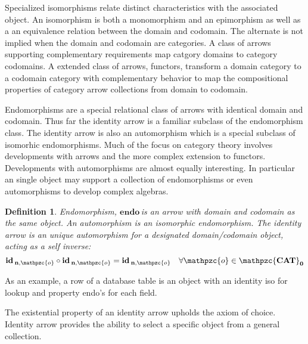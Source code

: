 \documentclass[aps,twocolumn,secnumarabic,nobalancelastpage,amsmath,amssymb,
amsthm,nofootinbib,parskip=full]{revtex4}
\numberwithin{equation}{section}
\newtheorem{definition}{Definition}[section]
\newcommand{\subp}[1]{\mathbf{#1}}
\newcommand{\obk}[1]{\mathpzc{#1}}
\newcommand{\oarrid}[2]{\oper{id}_{\subp{#1},\obk{#2}}}
\newcommand{\wrpobj}[1]{#1_{\subp{0}}}
\newcommand{\oper}[1]{\mathbf{#1}\,}
\newcommand{\largecat}{\mathbf{\mathpzc{CAT}}}
\newcommand{\largecatobj}{\wrpobj{\largecat}}
\begin{document}
Specialized isomorphisms relate distinct characteristics
with the associated object.
An isomorphism is both a
monomorphism and an epimorphism as well as a an
equivalence relation between the domain and codomain.
The alternate is not implied 
when the domain and codomain are categories.
A class of arrows supporting complementary requirements
map catgory domains to category codomains.
A extended class of arrows, functors,
transform a domain category
to a codomain category with complementary behavior
to map the compositional
properties of category arrow collections from domain to codomain.

Endomorphisms are a special relational class of arrows with
identical domain and codomain.
Thus far the identity arrow is a familiar subclass of the endomorphism class.
The identity arrow is also an automorphism which is a special subclass of
isomorhic endomorphisms. Much of the focus on category theory involves
developments with arrows and the more complex extension to functors.
Developments with automorphisms are almost equally interesting.
In particular an single object may support a collection of endomorphisms
or even automorphisms to develop complex algebras.

\begin{definition}{Endomorphism, $\oper{endo}$}\label{def:endomorphism}
  is an arrow with domain and codomain as the same object.
  An automorphism is an isomorphic endomorphism.
  The identity arrow is an unique automorphism for a designated
  domain/codomain object, acting as a self inverse:
\begin{equation*}
\oarrid{n}{o}\circ\oarrid{n}{o}=\oarrid{n}{o}\quad\forall\obk{o}\in\largecatobj
\end{equation*}
\end{definition}

As an example, a row of a
database table is an object with an identity iso for
lookup and property endo's for each field. 

The existential property of an identity arrow upholds
the axiom of choice. Identity arrow provides the ability to
select a specific object from a general collection.
\end{document}
